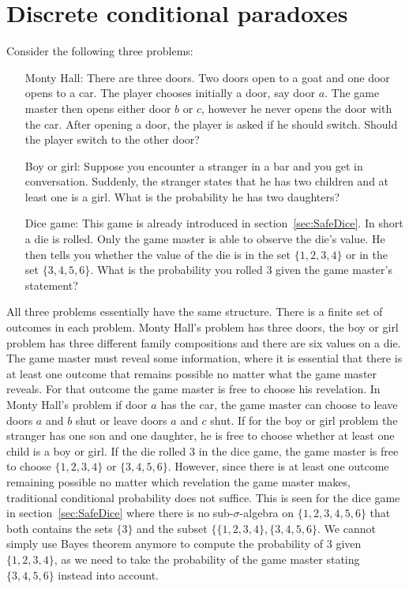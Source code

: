 \documentclass[twoside,a4paper]{report}
\theoremstyle{plain}
\theoremstyle{definition}
\theoremstyle{remark}
\numberwithin{equation}{chapter}
\DeclareMathOperator{\1}{\mathbbm{1}}
\begin{document}
\chapter{Discrete conditional paradoxes}\label{chap:DiscPara}
Consider the following three problems:
\begin{enumerate}
    \item[Monty Hall:] There are three doors. Two doors open to a goat and one door opens to a car. The player chooses initially a door, say door $a$. The game master then opens either door $b$ or $c$, however he never opens the door with the car. After opening a door, the player is asked if he should switch. Should the player switch to the other door?
    \item[Boy or girl:] Suppose you encounter a stranger in a bar and you get in conversation. Suddenly, the stranger states that he has two children and at least one is a girl. What is the probability he has two daughters?
    \item[Dice game:] This game is already introduced in section~\ref{sec:SafeDice}. In short a die is rolled. Only the game master is able to observe the die's value. He then tells you whether the value of the die is in the set $\{1,2,3,4\}$ or in the set $\{3,4,5,6\}$. What is the probability you rolled $3$ given the game master's statement?
\end{enumerate}
All three problems essentially have the same structure. There is a finite set of outcomes in each problem. Monty Hall's problem has three doors, the boy or girl problem has three different family compositions and there are six values on a die. The game master must reveal some information, where it is essential that there is at least one outcome that remains possible no matter what the game master reveals. For that outcome the game master is free to choose his revelation. In Monty Hall's problem if door $a$ has the car, the game master can choose to leave doors $a$ and $b$ shut or leave doors $a$ and $c$ shut. If for the boy or girl problem the stranger has one son and one daughter, he is free to choose whether at least one child is a boy or girl. If the die rolled 3 in the dice game, the game master is free to choose $\{1,2,3,4\}$ or $\{3,4,5,6\}$. However, since there is at least one outcome remaining possible no matter which revelation the game master makes, traditional conditional probability does not suffice. This is seen for the dice game in section~\ref{sec:SafeDice} where there is no sub-$\sigma$-algebra on $\{1,2,3,4,5,6\}$ that both contains the sets $\{3\}$ and the subset $\{\{1,2,3,4\},\{3,4,5,6\}$. We cannot simply use Bayes theorem anymore to compute the probability of $3$ given $\{1,2,3,4\}$, as we need to take the probability of the game master stating $\{3,4,5,6\}$ instead into account.
\end{document}
